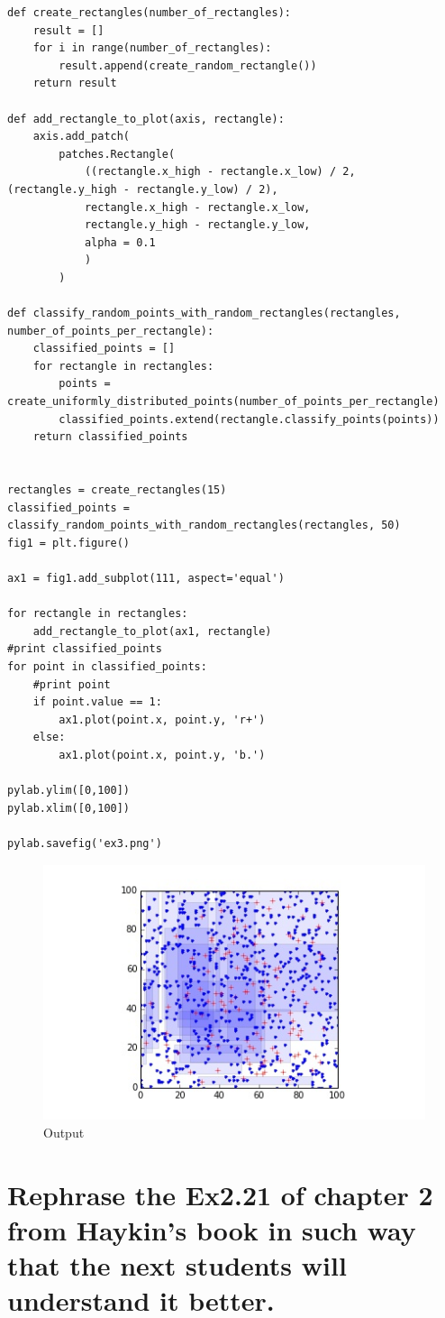 \documentclass[paper=a4, fontsize=11pt]{scrartcl} %
\numberwithin{equation}{section} %
\numberwithin{figure}{section} %
\numberwithin{table}{section} %
\begin{document}
\begin{lstlisting}
def create_rectangles(number_of_rectangles):
    result = []
    for i in range(number_of_rectangles):
        result.append(create_random_rectangle())
    return result
    
def add_rectangle_to_plot(axis, rectangle):
    axis.add_patch(
        patches.Rectangle(
            ((rectangle.x_high - rectangle.x_low) / 2, (rectangle.y_high - rectangle.y_low) / 2),
            rectangle.x_high - rectangle.x_low,
            rectangle.y_high - rectangle.y_low,
            alpha = 0.1
            )
        )

def classify_random_points_with_random_rectangles(rectangles, number_of_points_per_rectangle): 
    classified_points = []
    for rectangle in rectangles:
        points = create_uniformly_distributed_points(number_of_points_per_rectangle)
        classified_points.extend(rectangle.classify_points(points))
    return classified_points


rectangles = create_rectangles(15)
classified_points = classify_random_points_with_random_rectangles(rectangles, 50)
fig1 = plt.figure()

ax1 = fig1.add_subplot(111, aspect='equal')

for rectangle in rectangles:
    add_rectangle_to_plot(ax1, rectangle)
#print classified_points
for point in classified_points:
    #print point
    if point.value == 1:
        ax1.plot(point.x, point.y, 'r+')
    else:
        ax1.plot(point.x, point.y, 'b.')

pylab.ylim([0,100])
pylab.xlim([0,100])

pylab.savefig('ex3.png')
\end{lstlisting}

\begin{figure}[ht]
	\centering
  \includegraphics[width=0.7\textheight]{ex3.jpg}
	\caption{Output}
	\label{fig1}
\end{figure}

\section{Rephrase the Ex2.21 of chapter 2 from Haykin's book in such way that the next students will understand it better.}
\end{document}
